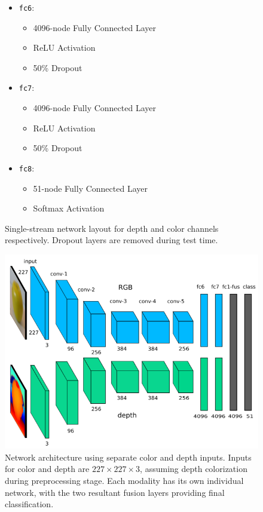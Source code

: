 \begin{figure}
\begin{mdframed}
\begin{itemize}
    \item \texttt{fc6}:
    \begin{itemize}
        \item 4096-node Fully Connected Layer
        \item ReLU Activation
        \item 50\% Dropout
    \end{itemize}
    \item \texttt{fc7}:
    \begin{itemize}
        \item 4096-node Fully Connected Layer
        \item ReLU Activation
        \item 50\% Dropout
    \end{itemize}
    \item \texttt{fc8}:
    \begin{itemize}
        \item 51-node Fully Connected Layer
        \item Softmax Activation
    \end{itemize}
\end{itemize}
\end{mdframed}
\caption{Single-stream network layout for depth and color channels respectively. Dropout layers are removed during test time.}
\label{fig:single_stream_layout}
\end{figure}

\begin{figure}
	\centering
	\includegraphics[width=0.85\linewidth]{img/architecture.png} 
	\caption{Network architecture using separate color and depth inputs. Inputs for color and depth are $227 \times 227 \times 3$, assuming depth colorization during preprocessing stage. Each modality has its own individual network, with the two resultant fusion layers providing final classification.}
	\label{fig:network}
\end{figure}


